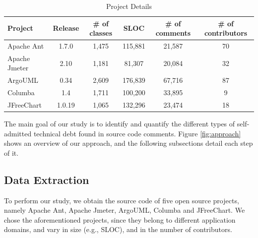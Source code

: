 \begin{table}[!hbt]
      \begin{center}
            \caption{Project Details}
            \label{tab:project_details}
            \begin{tabular}{l| c c c c c }
            \toprule
            \textbf{Project}   & \textbf{Release}  & \textbf{\# of classes}   & \textbf{SLOC}    & \textbf{\# of comments}  & \textbf{\# of contributors} \\ \midrule 
              Apache Ant       & 1.7.0             &  1,475                   & 115,881          & 21,587                   & 70  \\                                   
              Apache Jmeter    & 2.10              &  1,181                   & 81,307           & 20,084                   & 32  \\                                   
              ArgoUML          & 0.34              &  2,609                   & 176,839          & 67,716                   & 87  \\                                   
              Columba          & 1.4               &  1,711                   & 100,200          & 33,895                   & 9   \\                                   
              JFreeChart       & 1.0.19            &  1,065                   & 132,296          & 23,474                   & 18  \\ \bottomrule
            \end{tabular}
      \end{center}
\end{table}

The main goal of our study is to identify and quantify the different types of self-admitted technical debt found in source code comments. Figure \ref{fig:approach} shows an overview of our approach, and the following subsections detail each step of it.

\subsection{Data Extraction} %
\label{sub:data_extraction}

To perform our study, we obtain the source code of five open source projects, namely Apache Ant, Apache Jmeter, ArgoUML, Columba and JFreeChart. We chose the aforementioned projects, since they belong to different application domains, and vary in size (e.g., SLOC), and in the number of contributors.

